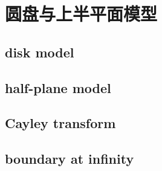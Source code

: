 \section{圆盘与上半平面模型}
\label{b3:sec:1303}


\subsection{disk model}
\label{b3:subsec:130301}

\subsection{half-plane model}
\label{b3:subsec:130302}

\subsection{Cayley transform}
\label{b3:subsec:130303}

\subsection{boundary at infinity}
\label{b3:subsec:130304}


